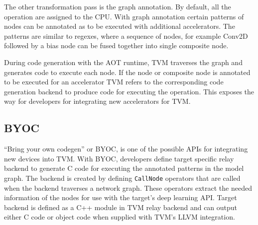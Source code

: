 \documentclass[12pt,a4paper,english
]{tunithesis}
\begin{document}
The other transformation pass is the graph annotation. By default, all the operation are assigned to the CPU. With graph annotation certain patterns of nodes can be annotated as to be executed with additional accelerators. The patterns are similar to regexes, where a sequence of nodes, for example Conv2D followed by a bias node can be fused together into single composite node.

During code generation with the AOT runtime, TVM traverses the graph and generates code to execute each node. If the node or composite node is annotated to be executed for an accelerator TVM refers to the corresponding code generation backend to produce code for executing the operation. This exposes the way for developers for integrating new accelerators for TVM.

\subsection{BYOC}
``Bring your own codegen'' or BYOC, is one of the possible APIs for integrating new devices into TVM.
With BYOC, developers define target specific relay backend to generate C code for executing the annotated patterns in the model graph.
The backend is created by defining \texttt{CallNode} operators that are called when the backend traverses a network graph.
These operators extract the needed information of the nodes for use with the target's deep learning API.
Target backend is defined as a C++ module in TVM relay backend and can output either C code or object code when supplied with TVM's LLVM integration.
\end{document}
